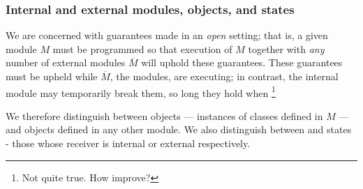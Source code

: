 \subsubsection{Internal and external modules, objects, and states}
 \label{s:concepts}

We are concerned with guarantees made in an \emph{open} setting; that is, a given module
$M$ must be programmed so that 
execution of $M$ together with \emph{any} number of external modules $\overline M$
will uphold these guarantees. %
These guarantees must be upheld while 
 $\overline M$, the  \emph{\externalM} modules, are executing; in contrast, the internal module may 
temporarily break them,
so long they %
hold when \footnote{Not quite true. How improve?} 
 
    
We therefore distinguish between  \emph{\internalO}
objects --- instances of classes defined in $M$ ---
and \emph{\externalO} objects defined in any other module.
We also distinguish between
  \emph{\internalC} and   \emph{\externalC} states - those whose receiver is internal or external respectively. 
 
 
%




